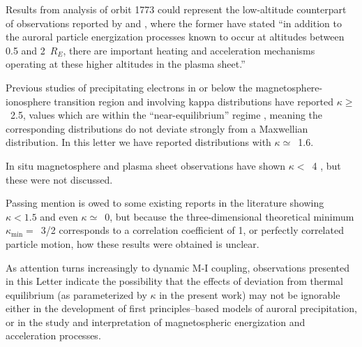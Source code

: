   Results from analysis of orbit 1773 could represent the
  low-altitude counterpart of observations reported by
  \citet{Wygant2002} and \citet{Schriver2003}, where the former have
  stated ``in addition to the auroral particle energization processes
  known to occur at altitudes between 0.5 and 2~$R_E$, there are
  important heating and acceleration mechanisms operating at these
  higher altitudes in the plasma sheet.''

  Previous studies of precipitating electrons in or below the
  magnetosphere-ionosphere transition region and involving kappa
  distributions \citep{Olsson1998,Ogasawara2006,Kaeppler2014a} have
  reported $\kappa \geq$~2.5, values which are within the
  ``near-equilibrium'' regime \citep{Livadiotis2010}, meaning the
  corresponding distributions do not deviate strongly from a
  Maxwellian distribution. In this letter we have reported
  distributions with $\kappa \simeq$~1.6. 

  In situ magnetosphere and plasma sheet observations
  \citet{Christon1989,Christon1991,Kletzing2003} have shown $\kappa
  <$~4 , but these were not discussed.

  Passing mention is owed to some existing reports in the literature
  showing $\kappa < 1.5$ and even $\kappa \simeq$~0, but because the
  three-dimensional theoretical minimum $\kappa_{\mathrm{min}} =$~3/2
  corresponds to a correlation coefficient of 1, or perfectly
  correlated particle motion, how these results were obtained is
  unclear.

  As attention turns increasingly to dynamic M-I coupling,
  observations presented in this Letter indicate the possibility that
  the effects of deviation from thermal equilibrium (as parameterized
  by $\kappa$ in the present work) may not be ignorable either in the
  development of first principles--based models of auroral
  precipitation, or in the study and interpretation of magnetospheric
  energization and acceleration processes.

  




